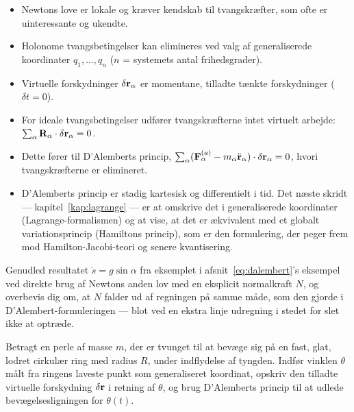 \begin{itemize}
  \item Newtons love er lokale og kræver kendskab til tvangskræfter,
        som ofte er uinteressante og ukendte.
  \item Holonome tvangsbetingelser kan elimineres ved valg af
        generaliserede koordinater $q_1,\dots,q_n$ ($n$ = systemets
        antal frihedsgrader).
  \item Virtuelle forskydninger $\delta\vb{r}_\alpha$ er momentane,
        tilladte tænkte forskydninger ($\delta t = 0$).
  \item For ideale tvangsbetingelser udfører tvangskræfterne intet
        virtuelt arbejde: $\sum_\alpha \vb{R}_\alpha\cdot\delta\vb{r}_\alpha=0$.
  \item Dette fører til D'Alemberts princip,
        $\sum_\alpha(\vb{F}_\alpha^{(a)}-m_\alpha\ddot{\vb{r}}_\alpha)\cdot\delta\vb{r}_\alpha=0$,
        hvori tvangskræfterne er elimineret.
  \item D'Alemberts princip er stadig kartesisk og differentielt i
        tid. Det næste skridt — kapitel~\ref{kap:lagrange} — er at
        omskrive det i generaliserede koordinater (Lagrange-formalismen)
        og at vise, at det er ækvivalent med et globalt
        variationsprincip (Hamiltons princip), som er den formulering,
        der peger frem mod Hamilton-Jacobi-teori og senere
        kvantisering.
\end{itemize}

\begin{opgave}
Genudled resultatet $\ddot{s}=g\sin\alpha$ fra eksemplet i
afsnit~\ref{eq:dalembert}'s eksempel ved direkte brug af Newtons anden
lov med en eksplicit normalkraft $N$, og overbevis dig om, at $N$ falder
ud af regningen på samme måde, som den gjorde i D'Alembert-formuleringen
— blot ved en ekstra linje udregning i stedet for slet ikke at optræde.
\end{opgave}

\begin{opgave}
Betragt en perle af masse $m$, der er tvunget til at bevæge sig på en
fast, glat, lodret cirkulær ring med radius $R$, under indflydelse af
tyngden. Indfør vinklen $\theta$ målt fra ringens laveste punkt som
generaliseret koordinat, opskriv den tilladte virtuelle forskydning
$\delta\vb{r}$ i retning af $\theta$, og brug D'Alemberts princip til
at udlede bevægelsesligningen for $\theta(t)$.
\end{opgave}
